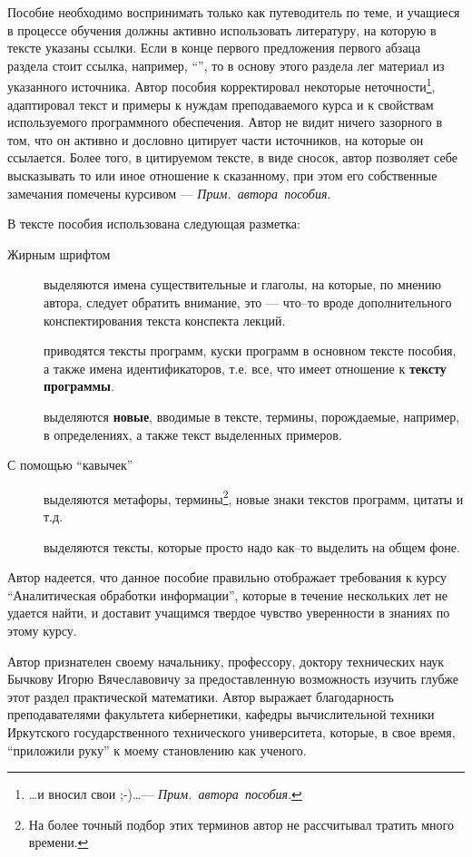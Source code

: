 \documentclass[12pt, openany, twoside]{book} %
\def\AR{{\em Прим.~автора~пособия}}
\begin{document}
Пособие необходимо воспринимать только как
путеводитель по теме, и учащиеся в
процессе обучения должны активно использовать литературу, на
которую в тексте указаны ссылки. Если в конце первого предложения
первого абзаца раздела стоит ссылка, например, ``\cite{AIDictionary}'', то
в основу этого раздела лег материал из указанного источника. Автор пособия корректировал
некоторые неточности\footnote{\ldots и вносил свои ;-)\ldots --- \AR.}, адаптировал текст и примеры к
нуждам преподаваемого курса и к свойствам используемого программного обеспечения.
Автор не видит ничего зазорного в том, что он активно и дословно
цитирует части источников, на которые он ссылается. Более того, в
цитируемом тексте, в виде сносок, автор позволяет себе высказывать
то или иное отношение к сказанному, при этом его собственные
замечания помечены курсивом --- \AR.

В тексте пособия использована следующая разметка:
\begin{description}
\item[Жирным шрифтом] выделяются имена существительные и глаголы, на которые,
по мнению автора, следует обратить внимание, это --- что--то вроде
дополнительного конспектирования текста конспекта лекций.
\item[] приводятся
тексты программ, куски программ в основном тексте пособия, а также имена
идентификаторов, т.е. все, что имеет отношение к {\bf тексту программы}.
\item[] выделяются
{\bf новые}, вводимые в тексте, термины,
порождаемые, например, в определениях, а также текст выделенных примеров.
\item[\normalfont С помощью ``кавычек''] выделяются
метафоры, термины\footnote{На более точный подбор этих терминов автор не рассчитывал
тратить много времени.}, новые знаки текстов программ, цитаты и т.д.
\item[]
вы\-де\-ля\-ю\-тся тексты, которые
просто надо как--то выделить на общем фоне.
\end{description}

Автор надеется, что данное пособие правильно отображает требования к курсу
``Аналитическая обработки информации'', которые в течение нескольких лет не удается найти,
и  доставит учащимся твердое чувство уверенности в знаниях по этому курсу.

Автор признателен своему начальнику, профессору, доктору технических наук
Бычкову Игорю Вячеславовичу за
предоставленную возможность изучить глубже этот раздел практической математики.
Автор выражает благодарность преподавателями факультета кибернетики, кафедры вычислительной техники Иркутского государственного технического университета, которые, в свое время,
``приложили руку'' к моему становлению как ученого.
\end{document}
